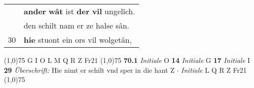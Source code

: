 \documentclass[8pt,a4paper,notitlepage]{article}
\begin{document}
\begin{table}[ht]
\begin{minipage}[t]{0.5\linewidth}
\begin{tabular}{rl}
 & \textbf{ander} \textbf{wât} ist \textbf{der} \textbf{vil} ungelîch.\\ 
 & den schilt nam er ze halse sân.\\ 
30 & \textbf{hie} stuont ein ors vil wolgetân,\\ 
\end{tabular}
\scriptsize
\line(1,0){75} \newline
G I O L M Q R Z Fr21 \newline
\line(1,0){75} \newline
\textbf{70.1} \textit{Initiale} O  \textbf{14} \textit{Initiale} G  \textbf{17} \textit{Initiale} I  \textbf{29} \textit{Überschrift:} Hie nimt er schilt vnd sper in die hant Z   $\cdot$ \textit{Initiale} L Q R Z Fr21  \newline
\line(1,0){75} \newline

\end{minipage}
\end{table}
\end{document}
